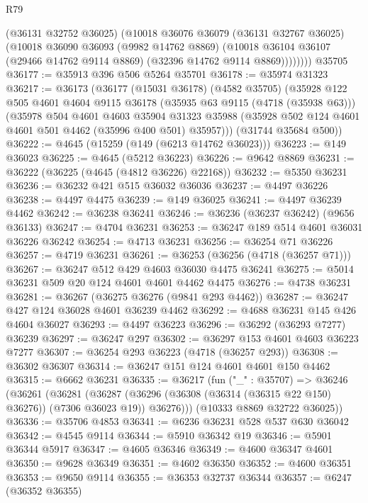 \begin{lexlean}{R79}
\begin{coremodule}
            (@36131 @32752 @36025)
            (@10018
              @36076
              @36079
              (@36131 @32767 @36025)
              (@10018
                @36090
                @36093
                (@9982 @14762 @8869)
                (@10018 @36104 @36107 (@29466 @14762 @9114 @8869) (@32396 @14762 @9114 @8869))))))))
    @35705
@36177 := @35913 @396 @506 @5264 @35701
@36178 := @35974 @31323
@36217 := @36173
    (@36177
      (@15031 @36178)
      (@4582 @35705)
      (@35928
        @122
        @505
        @4601
        @4604
        @9115
        @36178
        (@35935 @63 @9115 (@4718 (@35938 @63)))
        (@35978
          @504
          @4601
          @4603
          @35904
          @31323
          @35988
          (@35928 @502 @124 @4601 @4601 @501 @4462 (@35996 @400 @501) @35957)))
      (@31744 @35684 @500))
@36222 := @4645 (@15259 (@149 (@6213 @14762 @36023)))
@36223 := @149 @36023
@36225 := @4645 (@5212 @36223)
@36226 := @9642 @8869
@36231 := @36222 (@36225 (@4645 (@4812 @36226) @22168))
@36232 := @5350 @36231
@36236 := @36232 @421 @515 @36032 @36036
@36237 := @4497 @36226
@36238 := @4497 @4475
@36239 := @149 @36025
@36241 := @4497 @36239 @4462
@36242 := @36238 @36241
@36246 := @36236 (@36237 @36242) (@9656 @36133)
@36247 := @4704 @36231
@36253 := @36247 @189 @514 @4601 @36031 @36226 @36242
@36254 := @4713 @36231
@36256 := @36254 @71 @36226
@36257 := @4719 @36231
@36261 := @36253 (@36256 (@4718 (@36257 @71)))
@36267 := @36247 @512 @429 @4603 @36030 @4475 @36241
@36275 := @5014 @36231 @509 @20 @124 @4601 @4601 @4462 @4475
@36276 := @4738 @36231
@36281 := @36267 (@36275 @36276 (@9841 @293 @4462))
@36287 := @36247 @427 @124 @36028 @4601 @36239 @4462
@36292 := @4688 @36231 @145 @426 @4604 @36027
@36293 := @4497 @36223
@36296 := @36292 (@36293 @7277) @36239
@36297 := @36247 @297
@36302 := @36297 @153 @4601 @4603 @36223 @7277
@36307 := @36254 @293 @36223 (@4718 (@36257 @293))
@36308 := @36302 @36307
@36314 := @36247 @151 @124 @4601 @4601 @150 @4462
@36315 := @6662 @36231
@36335 := @36217
    (fun ("_" : @35707) =>
    @36246
      (@36261
        (@36281
          (@36287 (@36296 (@36308 (@36314 (@36315 @22 @150) @36276)) (@7306 @36023 @19)) @36276)))
      (@10333 @8869 @32722 @36025))
@36336 := @35706 @4853
@36341 := @6236 @36231 @528 @537 @630 @36042
@36342 := @4545 @9114
@36344 := @5910 @36342 @19
@36346 := @5901 @36344 @5917
@36347 := @4605 @36346
@36349 := @4600 @36347 @4601
@36350 := @9628 @36349
@36351 := @4602 @36350
@36352 := @4600 @36351
@36353 := @9650 @9114
@36355 := @36353 @32737 @36344
@36357 := @6247 (@36352 @36355)

\end{coremodule}
\end{lexlean}
